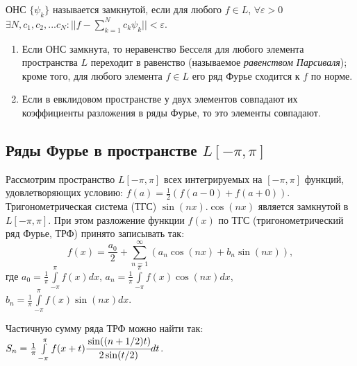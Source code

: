 \documentclass[a4paper,12pt]{scrartcl}
\begin{document}
ОНС $\{\psi_k\}$ называется замкнутой, если для любого $f\in L$, $\forall \varepsilon > 0$ $\exists N, c_1,c_2,...c_N: ||f - \sum\limits_{k=1}^{N}c_k\psi_k|| < \varepsilon$.

\begin{enumerate}
 \item Если ОНС замкнута, то неравенство Бесселя для любого элемента пространства $L$ переходит в равенство (называемое \textit{равенством Парсиваля}); кроме того, для любого элемента $f \in L$ его ряд Фурье сходится к $f$ по норме.
\item Если в евклидовом пространстве у двух элементов совпадают их коэффициенты разложения в ряды Фурье, то это элементы совпадают.
\end{enumerate}

\subsection{Ряды Фурье в пространстве $L[-\pi,\pi]$}
Рассмотрим пространство $L[-\pi,\pi]$ всех интегрируемых на $[-\pi,\pi]$ функций, удовлетворяющих условию: $f(a) = \frac{1}{2}(f(a-0)+f(a+0))$. Тригонометрическая система (ТГС) $\sin(nx).\cos(nx)$ является замкнутой в $L[-\pi,\pi]$. При этом разложение функции $f(x)$ по ТГС (тригонометрический ряд Фурье, ТРФ) принято записывать так:
$$f(x) = \frac{a_0}{2}+\sum\limits_{n=1}^{\infty}(a_n\cos(nx)+b_n\sin(nx)),$$
где $a_0 = \frac{1}{\pi}\int\limits_{-\pi}^{\pi}f(x)dx$, $a_n = \frac{1}{\pi}\int\limits_{-\pi}^{\pi}f(x)\cos(nx)dx$, $b_n = \frac{1}{\pi}\int\limits_{-\pi}^{\pi}f(x)\sin(nx)dx$.

Частичную сумму ряда ТРФ можно найти так: $S_n = \frac{1}{\pi}\int\limits_{-\pi}^{\pi}f(x+t)\cfrac{\sin((n+1/2)t)}{2\sin(t/2)}dt$.
\end{document}
